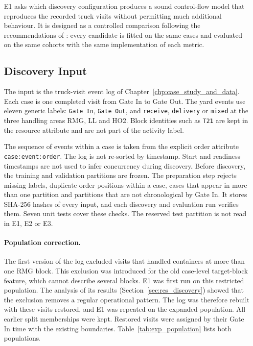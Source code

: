 E1 asks which discovery configuration produces a sound control-flow
model that reproduces the recorded truck visits without permitting
much additional behaviour. It is designed as a controlled comparison
following the recommendations of \textcite{RWRehse2024Experimentation}:
every candidate is fitted on the same cases and evaluated on the same
cohorts with the same implementation of each metric.

\subsection{Discovery Input}
\label{sec:exp_discovery_input}

The input is the truck-visit event log of
Chapter~\ref{chp:case_study_and_data}. Each case is one completed visit
from Gate In to Gate Out. The yard events use eleven generic labels:
\texttt{Gate In}, \texttt{Gate Out}, and \texttt{receive},
\texttt{delivery} or \texttt{mixed} at the three handling areas RMG, LL
and HO2. Block identities such as \texttt{T21} are kept in the resource
attribute and are not part of the activity label.

The sequence of events within a case is taken from the explicit order
attribute \texttt{case:event:order}. The log is not re-sorted by
timestamp. Start and readiness timestamps are not used to infer
concurrency during discovery. Before discovery, the training and
validation partitions are frozen. The preparation step rejects missing
labels, duplicate order positions within a case, cases that appear in
more than one partition and partitions that are not chronological by
Gate In. It stores SHA-256 hashes of every input, and each discovery and
evaluation run verifies them. Seven unit tests cover these checks. The
reserved test partition is not read in E1, E2 or E3.

\paragraph{Population correction.}
The first version of the log excluded visits that handled containers at
more than one RMG block. This exclusion was introduced for the old
case-level target-block feature, which cannot describe several blocks.
E1 was first run on this restricted population. The analysis of its
results (Section~\ref{sec:res_discovery}) showed that the exclusion
removes a regular operational pattern. The log was therefore rebuilt
with these visits restored, and E1 was repeated on the expanded
population. All earlier split memberships were kept. Restored visits were
assigned by their Gate In time with the existing boundaries.
Table~\ref{tab:exp_population} lists both populations.

